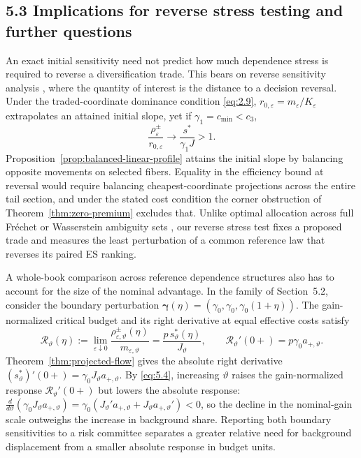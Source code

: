 \subsection{5.3 Implications for reverse stress testing and further questions}\label{sec:implications}
An exact initial sensitivity need not predict how much dependence stress is required to reverse a diversification trade. This bears on reverse sensitivity analysis \cite{pesenti2019,pesenti2022}, where the quantity of interest is the distance to a decision reversal. Under the traded-coordinate dominance condition \eqref{eq:2.9}, \(r_{0,\varepsilon}=m_\varepsilon/K_\varepsilon\) extrapolates an attained initial slope, yet if \(\gamma_1=c_{\min}<c_3\),
\[
\frac{\rho^\pm_\varepsilon}{r_{0,\varepsilon}}\longrightarrow\frac{s^*}{\gamma_1J}>1.
\]
Proposition~\ref{prop:balanced-linear-profile} attains the initial slope by balancing opposite movements on selected fibers. Equality in the efficiency bound at reversal would require balancing cheapest-coordinate projections across the entire tail section, and under the stated cost condition the corner obstruction of Theorem~\ref{thm:zero-premium} excludes that. Unlike optimal allocation across full Fr\'echet or Wasserstein ambiguity sets \cite{liu2026}, our reverse stress test fixes a proposed trade and measures the least perturbation of a common reference law that reverses its paired ES ranking.

A whole-book comparison across reference dependence structures also has to account for the size of the nominal advantage. In the family of Section~5.2, consider the boundary perturbation \(\boldsymbol\gamma(\eta)=(\gamma_0,\gamma_0,\gamma_0(1+\eta))\). The gain-normalized critical budget and its right derivative at equal effective costs satisfy
\[
\mathcal R_\vartheta(\eta):=\lim_{\varepsilon\downarrow0}
\frac{\rho^\pm_{\varepsilon,\vartheta}(\eta)}{m_{\varepsilon,\vartheta}}
=\frac{p\,s^*_\vartheta(\eta)}{J_\vartheta},\qquad
\mathcal R_\vartheta'(0+)=p\gamma_0a_{+,\vartheta}.
\]
Theorem~\ref{thm:projected-flow} gives the absolute right derivative \((s^*_\vartheta)'(0+)=\gamma_0J_\vartheta a_{+,\vartheta}\). By \eqref{eq:5.4}, increasing \(\vartheta\) raises the gain-normalized response \(\mathcal R_\vartheta'(0+)\) but lowers the absolute response: \mbox{\(\frac{d}{d\vartheta}(\gamma_0J_\vartheta a_{+,\vartheta})=\gamma_0(J_\vartheta'a_{+,\vartheta}+J_\vartheta a_{+,\vartheta}')<0\)}, so the decline in the nominal-gain scale outweighs the increase in background share. Reporting both boundary sensitivities to a risk committee separates a greater relative need for background displacement from a smaller absolute response in budget units.

